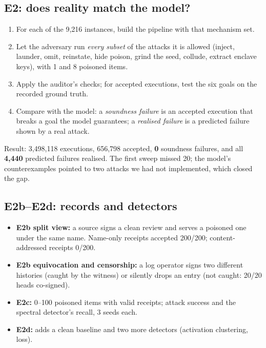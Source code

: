 \subsection{E2: does reality match the model?}
\begin{enumerate}
\item For each of the 9,216 instances, build the pipeline with that mechanism set.
\item Let the adversary run \emph{every subset} of the attacks it is allowed (inject, launder,
  omit, reinstate, hide poison, grind the seed, collude, extract enclave keys), with 1 and 8
  poisoned items.
\item Apply the auditor's checks; for accepted executions, test the six goals on the
  recorded ground truth.
\item Compare with the model: a \emph{soundness failure} is an accepted execution that breaks
  a goal the model guarantees; a \emph{realised failure} is a predicted failure shown by a
  real attack.
\end{enumerate}
Result: 3,498,118 executions, 656,798 accepted, \textbf{0} soundness failures, and all
\textbf{4,440} predicted failures realised. The first sweep missed 20; the model's
counterexamples pointed to two attacks we had not implemented, which closed the gap.

\subsection{E2b--E2d: records and detectors}
\begin{itemize}
\item \textbf{E2b split view:} a source signs a clean review and serves a poisoned one under the
  same name. Name-only receipts accepted 200/200; content-addressed receipts 0/200.
\item \textbf{E2b equivocation and censorship:} a log operator signs two different histories
  (caught by the witness) or silently drops an entry (not caught: 20/20 heads co-signed).
\item \textbf{E2c:} 0--100 poisoned items with valid receipts; attack success and the spectral
  detector's recall, 3 seeds each.
\item \textbf{E2d:} adds a clean baseline and two more detectors (activation clustering, loss).
\end{itemize}

